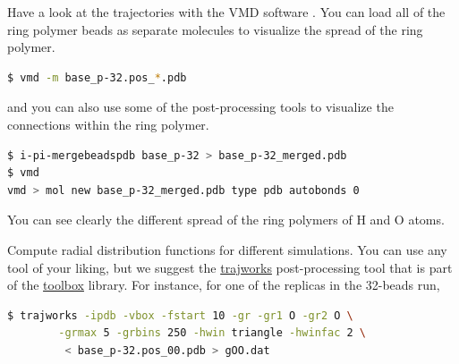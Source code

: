 \documentclass{article}
\begin{document}
\begin{Exercise}[label={basic},title={A PIMD simulation of liquid water}]
\Question
Have a look at the trajectories with the VMD software 
. 
You can load all of the ring polymer beads as separate molecules to visualize the
spread of the ring polymer.
\begin{lstlisting}[language=bash]
$ vmd -m base_p-32.pos_*.pdb 
\end{lstlisting}%
and you can also use some of the \ipi{} post-processing tools to visualize
the connections within the ring polymer. 
\begin{lstlisting}[language=bash]
$ i-pi-mergebeadspdb base_p-32 > base_p-32_merged.pdb
$ vmd
vmd > mol new base_p-32_merged.pdb type pdb autobonds 0
\end{lstlisting}
You can see clearly the different spread of the ring polymers of H and O atoms.

\Question
Compute radial distribution functions for different simulations. You
can use any tool of your liking, but we suggest the \url{trajworks} 
post-processing tool that is part of the \url{toolbox} library.
For instance, for one of the replicas in the 32-beads run,
\begin{lstlisting}[language=bash]
$ trajworks -ipdb -vbox -fstart 10 -gr -gr1 O -gr2 O \
        -grmax 5 -grbins 250 -hwin triangle -hwinfac 2 \
         < base_p-32.pos_00.pdb > gOO.dat
\end{lstlisting}%

\end{Exercise}
\end{document}
